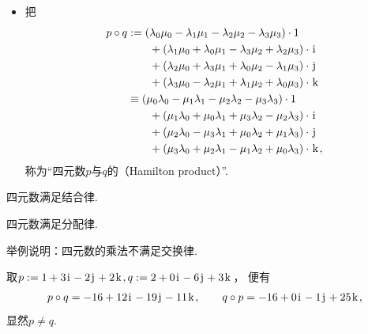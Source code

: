 \begin{definition}
\begin{itemize}
	\item 把\begin{equation}
		\begin{aligned}
			p \circ q
			&:=
			(\lambda_0 \mu_0 - \lambda_1 \mu_1 - \lambda_2 \mu_2 - \lambda_3 \mu_3) \cdot 1 \\
			&\hspace{20pt}
				+ (\lambda_1 \mu_0 + \lambda_0 \mu_1 - \lambda_3 \mu_2 + \lambda_2 \mu_3) \cdot \kern1pt\mathrm{i}\kern1pt \\
			&\hspace{20pt}
				+ (\lambda_2 \mu_0 + \lambda_3 \mu_1 + \lambda_0 \mu_2 - \lambda_1 \mu_3) \cdot \kern1pt\mathrm{j}\kern1pt \\
			&\hspace{20pt}
				+ (\lambda_3 \mu_0 - \lambda_2 \mu_1 + \lambda_1 \mu_2 + \lambda_0 \mu_3) \cdot \kern1pt\mathrm{k}\kern1pt \\
			&\equiv
			(\mu_0 \lambda_0 - \mu_1 \lambda_1 - \mu_2 \lambda_2 - \mu_3 \lambda_3) \cdot 1 \\
			&\hspace{20pt}
				+ (\mu_1 \lambda_0 + \mu_0 \lambda_1 + \mu_3 \lambda_2 - \mu_2 \lambda_3) \cdot \kern1pt\mathrm{i}\kern1pt \\
			&\hspace{20pt}
				+ (\mu_2 \lambda_0 - \mu_3 \lambda_1 + \mu_0 \lambda_2 + \mu_1 \lambda_3) \cdot \kern1pt\mathrm{j}\kern1pt \\
			&\hspace{20pt}
				+ (\mu_3 \lambda_0 + \mu_2 \lambda_1 - \mu_1 \lambda_2 + \mu_0 \lambda_3) \cdot \kern1pt\mathrm{k}\kern1pt,
		\end{aligned}
	\end{equation}
	称为“四元数\(p\)与\(q\)的（Hamilton product）”.
\end{itemize}
\end{definition}

\begin{property}
四元数满足结合律.
\end{property}

\begin{property}
四元数满足分配律.
\end{property}

\begin{example}
举例说明：四元数的乘法不满足交换律.
\begin{solution}
取\(
	p := 1 + 3 \kern1pt\mathrm{i}\kern1pt - 2 \kern1pt\mathrm{j}\kern1pt + 2 \kern1pt\mathrm{k}\kern1pt,
	q := 2 + 0 \kern1pt\mathrm{i}\kern1pt - 6 \kern1pt\mathrm{j}\kern1pt + 3 \kern1pt\mathrm{k}\kern1pt
\)，
便有\begin{equation*}
	p \circ q
	= -16 + 12 \kern1pt\mathrm{i}\kern1pt - 19 \kern1pt\mathrm{j}\kern1pt - 11 \kern1pt\mathrm{k}\kern1pt,
	\qquad
	q \circ p
	= -16 + 0 \kern1pt\mathrm{i}\kern1pt - 1 \kern1pt\mathrm{j}\kern1pt + 25 \kern1pt\mathrm{k}\kern1pt,
\end{equation*}
显然\(p \neq q\).
\end{solution}
\end{example}

